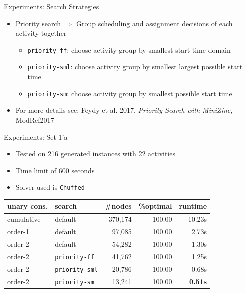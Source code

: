 \documentclass{beamer}
\begin{document}
\begin{frame}{Experiments: Search Strategies}
	\begin{itemize}
		\item Priority search $\Rightarrow$ Group scheduling and assignment decisions of each activity together\vspace{2mm}\pause
		\begin{itemize}
			\item {\tt priority-ff}: choose activity group by smallest start time domain \vspace{2mm}
			\item {\tt priority-sml}: choose activity group by smallest largest possible start time\vspace{2mm}
			\item {\tt priority-sm}: choose activity group by smallest possible start time\pause
		\end{itemize}
		\item For more details see: Feydy et al. 2017, \emph{Priority Search with MiniZinc}, ModRef2017
	\end{itemize}
\end{frame}


\begin{frame}{Experiments: Set 1'a}
	\begin{itemize}
		\item Tested on 216 generated instances with 22 activities 
		\item Time limit of 600 seconds
		\item Solver used is {\tt Chuffed}
	\end{itemize}
	\begin{table}[tpb]
	\begin{adjustwidth}{-.9in}{-.9in}
    \centering
    \small
    \begin{tabular}{llrrr}
        \toprule
        unary cons. & search & \#nodes & \%optimal & runtime   \\
        \midrule\midrule
        cumulative & default & 370,174 & 100.00 & 10.23s \\
        order-1 & default & 97,085 & 100.00 & 2.73s \\
        order-2 & default & 54,282 & 100.00 & 1.30s \\
        \midrule\pause
        order-2 & {\tt priority-ff}    & 41,762 & 100.00 & 1.25s \\
        order-2 & {\tt priority-sml}    & 20,786 & 100.00 & 0.68s \\
        order-2 & {\tt priority-sm}    & 13,241 & 100.00 & {\color{red} {\bf 0.51s} }\\
        \bottomrule
    \end{tabular}
	\end{adjustwidth}
    \label{tab:resultsSet1a}
\end{table}
\end{frame}
\end{document}
